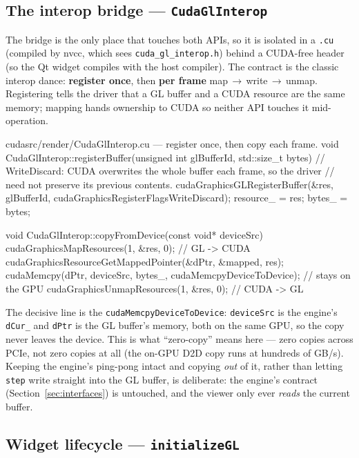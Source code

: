 \documentclass[
	english,
	letterpaper, oneside
]{article}
\begin{document}
\subsection{The interop bridge --- \texttt{CudaGlInterop}}
\label{sec:gui-bridge}

The bridge is the only place that touches both APIs, so it is isolated in a
\texttt{.cu} (compiled by nvcc, which sees \texttt{cuda\_gl\_interop.h}) behind a
CUDA-free header (so the Qt widget compiles with the host compiler). The contract
is the classic interop dance: \textbf{register once}, then \textbf{per frame}
map\,$\rightarrow$\,write\,$\rightarrow$\,unmap. Registering tells the driver that
a GL buffer and a CUDA resource are the same memory; mapping hands ownership to
CUDA so neither API touches it mid-operation.

\begin{sourcecode}{cuda}{src/render/CudaGlInterop.cu --- register once, then copy each frame.}
void CudaGlInterop::registerBuffer(unsigned int glBufferId, std::size_t bytes) {
  // WriteDiscard: CUDA overwrites the whole buffer each frame, so the driver
  // need not preserve its previous contents.
  cudaGraphicsGLRegisterBuffer(&res, glBufferId, cudaGraphicsRegisterFlagsWriteDiscard);
  resource_ = res; bytes_ = bytes;
}

void CudaGlInterop::copyFromDevice(const void* deviceSrc) {
  cudaGraphicsMapResources(1, &res, 0);                     // GL -> CUDA
  cudaGraphicsResourceGetMappedPointer(&dPtr, &mapped, res);
  cudaMemcpy(dPtr, deviceSrc, bytes_, cudaMemcpyDeviceToDevice); // stays on the GPU
  cudaGraphicsUnmapResources(1, &res, 0);                   // CUDA -> GL
}
\end{sourcecode}

The decisive line is the \texttt{cudaMemcpyDeviceToDevice}: \texttt{deviceSrc} is
the engine's \texttt{dCur\_} and \texttt{dPtr} is the GL buffer's memory, both on
the same GPU, so the copy never leaves the device. This is what ``zero-copy''
means here --- zero copies across PCIe, not zero copies at all (the on-GPU D2D
copy runs at hundreds of GB/s). Keeping the engine's ping-pong intact and copying
\emph{out} of it, rather than letting \texttt{step} write straight into the GL
buffer, is deliberate: the engine's contract (Section~\ref{sec:interfaces}) is
untouched, and the viewer only ever \emph{reads} the current buffer.

\subsection{Widget lifecycle --- \texttt{initializeGL}}
\end{document}
